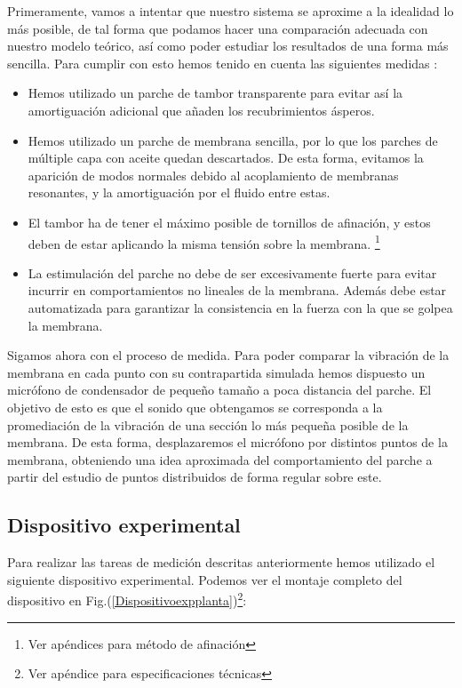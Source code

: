 \documentclass[journal, a4paper,onecolumn]{IEEEtran}
\newcommand{\figref}[1]{Fig.(\ref{#1})}
\begin{document}
Primeramente, vamos a intentar que nuestro sistema se aproxime a la idealidad lo más posible, de tal forma que podamos hacer una comparación adecuada con nuestro  modelo teórico, así como poder estudiar los resultados de una forma más sencilla. Para cumplir con esto hemos tenido en cuenta las siguientes medidas \cite{master}:
\vspace{0.5cm}


\begin{itemize}
    \item Hemos utilizado un parche de tambor transparente para evitar así la amortiguación adicional que añaden los recubrimientos ásperos.

    \item Hemos utilizado un parche de membrana sencilla, por lo que los parches de múltiple capa con aceite quedan descartados. De esta forma, evitamos la aparición de modos normales debido al acoplamiento de membranas resonantes, y la amortiguación por el fluido entre estas.
    
    \item El tambor ha de tener el máximo posible de tornillos de afinación, y estos deben de estar aplicando la misma tensión sobre la membrana. \footnote{Ver apéndices para método de afinación}
    
    \item La estimulación del parche no debe de ser excesivamente fuerte para evitar incurrir en comportamientos no lineales de la membrana. Además debe estar automatizada para garantizar la consistencia en la fuerza con la que se golpea la membrana.
\end{itemize}
\vspace{0.5cm}
 
Sigamos ahora con el proceso de medida. Para poder comparar la vibración de la membrana en cada punto con su contrapartida simulada hemos dispuesto un micrófono de condensador de pequeño tamaño a poca distancia del parche. El objetivo de esto es que el sonido que obtengamos se corresponda a la promediación de la vibración de una sección lo más pequeña posible de la membrana. De esta forma, desplazaremos el micrófono por distintos puntos de la membrana, obteniendo una idea aproximada del comportamiento del parche a partir del estudio de puntos distribuidos de forma regular sobre este.  \newline

\subsection{Dispositivo experimental}
Para realizar las tareas de medición descritas anteriormente hemos utilizado el siguiente dispositivo experimental. Podemos ver el montaje completo del dispositivo en \figref{Dispositivoexpplanta}\footnote{Ver apéndice para especificaciones técnicas}: \newline
\end{document}
